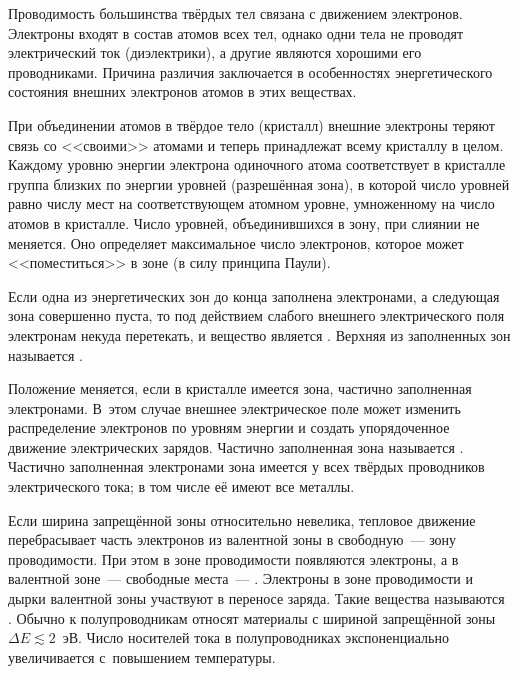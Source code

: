 
Проводимость большинства твёрдых тел связана с движением электронов. Электроны
входят в состав атомов всех тел, однако одни тела не проводят электрический ток
(диэлектрики), а другие являются хорошими его проводниками. Причина различия
заключается в особенностях энергетического состояния внешних электронов атомов в
этих веществах.

При объединении атомов в твёрдое тело (кристалл) внешние электроны теряют связь
со <<своими>> атомами и теперь принадлежат всему кристаллу в целом. Каждому
уровню энергии электрона одиночного атома соответствует в кристалле группа
близких по энергии уровней (разрешённая зона), в которой число уровней равно
числу мест на соответствующем атомном уровне, умноженному на число атомов в
кристалле. Число уровней, объединившихся в зону, при слиянии не меняется. Оно
определяет максимальное число электронов, которое может <<поместиться>> в зоне
(в силу принципа Паули).

Если одна из энергетических зон до конца заполнена электронами, а следующая зона
совершенно пуста, то под действием слабого внешнего электрического поля
электронам некуда перетекать, и вещество является .
Верхняя из заполненных зон называется .

Положение меняется, если в кристалле имеется зона, частично заполненная
электронами. В~этом случае внешнее электрическое поле может изменить
распределение электронов по уровням энергии и создать упорядоченное движение
электрических зарядов. Частично заполненная зона называется . Частично заполненная электронами зона имеется у всех твёрдых
проводников электрического тока; в том числе её имеют все металлы.

Если ширина запрещённой зоны относительно невелика, тепловое движение
перебрасывает часть электронов из валентной зоны в свободную~--- зону
проводимости. При этом в зоне проводимости появляются электроны, а в валентной
зоне~--- свободные места~--- . Электроны в зоне проводимости и
дырки валентной зоны участвуют в переносе заряда. Такие вещества называются
. Обычно к полупроводникам относят материалы с
шириной запрещённой зоны $\Delta E \lesssim 2$~эВ. Число носителей тока в
полупроводниках экспоненциально увеличивается с~повышением температуры.


